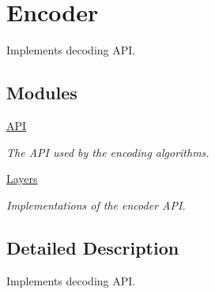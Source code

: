 \hypertarget{group__encoder}{\section{Encoder}
\label{group__encoder}
}


Implements decoding A\-P\-I.  


\subsection*{Modules}
\begin{DoxyCompactItemize}
\item 
\hyperlink{group__encoder__api}{A\-P\-I}
\begin{DoxyCompactList}\small\item\em The A\-P\-I used by the encoding algorithms. \end{DoxyCompactList}\item 
\hyperlink{group__encoder__layers}{Layers}
\begin{DoxyCompactList}\small\item\em Implementations of the encoder A\-P\-I. \end{DoxyCompactList}\end{DoxyCompactItemize}


\subsection{Detailed Description}
Implements decoding A\-P\-I. 